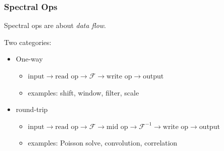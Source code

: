 \documentclass[10pt,aspectratio=169]{beamer}
\begin{document}
\begin{frame}
  \frametitle{Spectral Ops}

  \begin{center}
    Spectral ops are about \emph{data flow}.
  \end{center}
    
  \medskip
  
  Two categories:
  \begin{itemize}
  \item One-way
    \begin{itemize}
      \item $
    \text{input}
    \rightarrow \text{read op}
    \rightarrow \mathcal{F}
    \rightarrow \text{write op}
    \rightarrow \text{output}
    $
  \item examples: shift, window, filter, scale
    \end{itemize}

  \item round-trip\\
    \begin{itemize}
    \item$
      \text{input}
      \rightarrow \text{read op}
      \rightarrow \mathcal{F}
      \rightarrow \text{mid op}
      \rightarrow \mathcal{F}^{-1}
      \rightarrow \text{write op}
      \rightarrow \text{output}
      $
      \item examples: Poisson solve, convolution, correlation
    \end{itemize}
  \end{itemize}

\end{frame}
\end{document}
